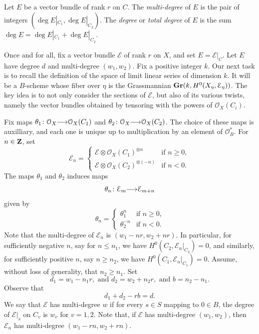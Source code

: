 \documentclass[11pt,reqno]{amsart}
\theoremstyle{plain}
\theoremstyle{definition}
\theoremstyle{remark}
\numberwithin{equation}{section}
\renewcommand{\to}{{\longrightarrow}}
\numberwithin{equation}{section}
\renewcommand{\O}{\mathcal O}
\begin{document}
Let $E$ be a vector bundle of rank $r$ on $C$.
The \emph{multi-degree} of $E$ is the pair of integers $(\deg E|_{C_1}, \deg E|_{C_2})$.
The \emph{degree} or \emph{total degree} of $E$ is the sum $\deg E = \deg E|_{C_1} + \deg E|_{C_2}$.

Once and for all, fix a vector bundle $\mathcal E$ of rank $r$ on $X$, and set $E = \mathcal E|_C$.
Let $E$ have degree $d$ and multi-degree $(w_1, w_2)$.
Fix a positive integer $k$.
Our next task is to recall the definition of the space of limit linear series of dimension $k$.
It will be a $B$-scheme whose fiber over $\eta$ is the Grassmannian ${\bf Gr}(k, H^0(X_\eta, \mathcal E_\eta))$.
The key idea is to not only consider the sections of $\mathcal E$, but also of its various twists, namely the vector bundles obtained by tensoring with the powers of $\O_X(C_i)$.

Fix maps $\theta_1 \from \O_X \to \O_X(C_1)$ and $\theta_2 \from \O_X \to \O_X(C_2)$.
The choice of these maps is auxilliary, and each one is unique up to multiplication by an element of $\O_B^*$.
For $n \in {\bf Z}$, set
\[ \mathcal E_n =
  \begin{cases}
    \mathcal E \otimes \O_X(C_1)^{\otimes n} & \text{if $n \geq 0$},\\
    \mathcal E \otimes \O_X(C_2)^{\otimes (-n)}  & \text{if $n < 0$}.
  \end{cases}
\]
The maps $\theta_1$ and $\theta_2$ induces maps
\[ \theta_n \from \mathcal E_m \to \mathcal E_{m+n}\]
given by
\[
  \theta_n = 
  \begin{cases}
    \theta_1^n & \text{if $n \geq 0$,} \\
    \theta_2^{-n} & \text{if $n < 0$.}
  \end{cases}
\]
Note that the multi-degree of $\mathcal E_n$ is $(w_1 - nr, w_2 + nr)$.
In particular, for sufficiently negative $n$, say for $n \leq n_1$, we have $H^0(C_2, \mathcal E_n|_{C_2}) = 0$, and similarly, for sufficiently positive $n$, say $n \geq n_2$, we have $H^0(C_1, \mathcal E_n|_{C_1}) = 0$.
Assume, without loss of generality, that $n_2 \geq n_1$.
Set
\[ d_1 = w_1 - n_1 r, \text{ and } d_2 = w_2 + n_2 r, \text{ and } b = n_2 - n_1.\]
Observe that
\[ d_1 + d_2 - rb = d.\]
We say that $\mathcal E$ has multi-degree $w$ if for every $s \in S$ mapping to $0 \in B$, the degree of $\mathcal E|_s$ on $C_v$ is $w_v$ for $v = 1, 2$.
Note that, if $\mathcal E$ has multi-degree $(w_1, w_2)$, then $\mathcal E_n$ has multi-degree $(w_1-rn, w_2+rn)$.
\end{document}
